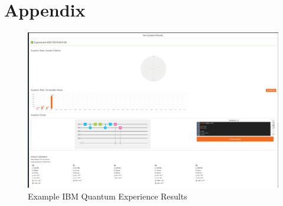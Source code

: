 \documentclass[a4paper]{article}
\begin{document}





























\newpage
\section{Appendix} %

\begin{figure}[H] %
\begin{center}
	\includegraphics[scale=0.34]{ScreencapIBMQE_Superdense} %
\end{center}
\caption{Example IBM Quantum Experience Results}\label{IBMQE:ExampleResuts}
\end{figure}
\end{document}

